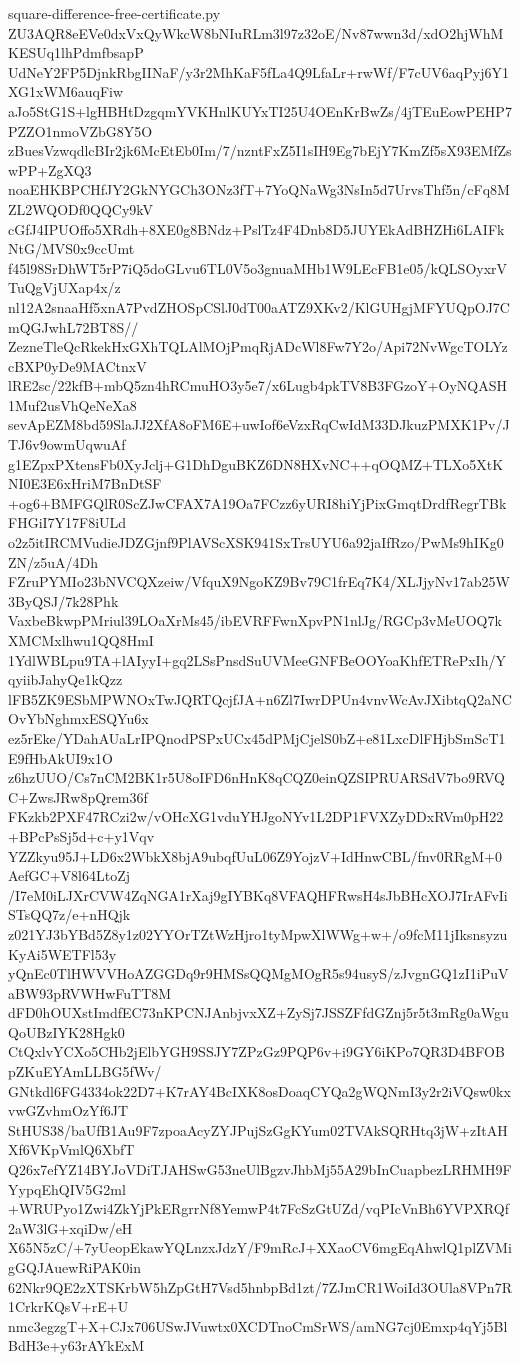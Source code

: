 \documentclass[11pt]{article}
\theoremstyle{definition}
\theoremstyle{remark}
\begin{document}
\begin{filecontents*}[overwrite]{square-difference-free-certificate.py}
ZU3AQR8eEVe0dxVxQyWkcW8bNIuRLm3l97z32oE/Nv87wwn3d/xdO2hjWhMKESUq1lhPdmfbsapP
UdNeY2FP5DjnkRbgIINaF/y3r2MhKaF5fLa4Q9LfaLr+rwWf/F7cUV6aqPyj6Y1XG1xWM6auqFiw
aJo5StG1S+lgHBHtDzgqmYVKHnlKUYxTI25U4OEnKrBwZs/4jTEuEowPEHP7PZZO1nmoVZbG8Y5O
zBuesVzwqdlcBIr2jk6McEtEb0Im/7/nzntFxZ5I1sIH9Eg7bEjY7KmZf5sX93EMfZswPP+ZgXQ3
noaEHKBPCHfJY2GkNYGCh3ONz3fT+7YoQNaWg3NsIn5d7UrvsThf5n/cFq8MZL2WQODf0QQCy9kV
cGfJ4IPUOffo5XRdh+8XE0g8BNdz+PslTz4F4Dnb8D5JUYEkAdBHZHi6LAIFkNtG/MVS0x9ccUmt
f45l98SrDhWT5rP7iQ5doGLvu6TL0V5o3gnuaMHb1W9LEcFB1e05/kQLSOyxrVTuQgVjUXap4x/z
nl12A2snaaHf5xnA7PvdZHOSpCSlJ0dT00aATZ9XKv2/KlGUHgjMFYUQpOJ7CmQGJwhL72BT8S//
ZezneTleQcRkekHxGXhTQLAlMOjPmqRjADcWl8Fw7Y2o/Api72NvWgcTOLYzcBXP0yDe9MACtnxV
lRE2sc/22kfB+mbQ5zn4hRCmuHO3y5e7/x6Lugb4pkTV8B3FGzoY+OyNQASH1Muf2usVhQeNeXa8
sevApEZM8bd59SlaJJ2XfA8oFM6E+uwIof6eVzxRqCwIdM33DJkuzPMXK1Pv/JTJ6v9owmUqwuAf
g1EZpxPXtensFb0XyJclj+G1DhDguBKZ6DN8HXvNC++qOQMZ+TLXo5XtKNI0E3E6xHriM7BnDtSF
+og6+BMFGQlR0ScZJwCFAX7A19Oa7FCzz6yURI8hiYjPixGmqtDrdfRegrTBkFHGiI7Y17F8iULd
o2z5itIRCMVudieJDZGjnf9PlAVScXSK941SxTrsUYU6a92jaIfRzo/PwMs9hIKg0ZN/z5uA/4Dh
FZruPYMIo23bNVCQXzeiw/VfquX9NgoKZ9Bv79C1frEq7K4/XLJjyNv17ab25W3ByQSJ/7k28Phk
VaxbeBkwpPMriul39LOaXrMs45/ibEVRFFwnXpvPN1nlJg/RGCp3vMeUOQ7kXMCMxlhwu1QQ8HmI
1YdlWBLpu9TA+lAIyyI+gq2LSsPnsdSuUVMeeGNFBeOOYoaKhfETRePxIh/YqyiibJahyQe1kQzz
lFB5ZK9ESbMPWNOxTwJQRTQcjfJA+n6Zl7IwrDPUn4vnvWcAvJXibtqQ2aNCOvYbNghmxESQYu6x
ez5rEke/YDahAUaLrIPQnodPSPxUCx45dPMjCjelS0bZ+e81LxcDlFHjbSmScT1E9fHbAkUI9x1O
z6hzUUO/Cs7nCM2BK1r5U8oIFD6nHnK8qCQZ0einQZSIPRUARSdV7bo9RVQC+ZwsJRw8pQrem36f
FKzkb2PXF47RCzi2w/vOHcXG1vduYHJgoNYv1L2DP1FVXZyDDxRVm0pH22+BPcPsSj5d+c+y1Vqv
YZZkyu95J+LD6x2WbkX8bjA9ubqfUuL06Z9YojzV+IdHnwCBL/fnv0RRgM+0AefGC+V8l64LtoZj
/I7eM0iLJXrCVW4ZqNGA1rXaj9gIYBKq8VFAQHFRwsH4sJbBHcXOJ7IrAFvIiSTsQQ7z/e+nHQjk
z021YJ3bYBd5Z8y1z02YYOrTZtWzHjro1tyMpwXlWWg+w+/o9fcM11jIksnsyzuKyAi5WETFl53y
yQnEc0TlHWVVHoAZGGDq9r9HMSsQQMgMOgR5s94usyS/zJvgnGQ1zI1iPuVaBW93pRVWHwFuTT8M
dFD0hOUXstImdfEC73nKPCNJAnbjvxXZ+ZySj7JSSZFfdGZnj5r5t3mRg0aWguQoUBzIYK28Hgk0
CtQxlvYCXo5CHb2jElbYGH9SSJY7ZPzGz9PQP6v+i9GY6iKPo7QR3D4BFOBpZKuEYAmLLBG5fWv/
GNtkdl6FG4334ok22D7+K7rAY4BcIXK8osDoaqCYQa2gWQNmI3y2r2iVQsw0kxvwGZvhmOzYf6JT
StHUS38/baUfB1Au9F7zpoaAcyZYJPujSzGgKYum02TVAkSQRHtq3jW+zItAHXf6VKpVmlQ6XbfT
Q26x7efYZ14BYJoVDiTJAHSwG53neUlBgzvJhbMj55A29bInCuapbezLRHMH9FYypqEhQIV5G2ml
+WRUPyo1Zwi4ZkYjPkERgrrNf8YemwP4t7FcSzGtUZd/vqPIcVnBh6YVPXRQf2aW3lG+xqiDw/eH
X65N5zC/+7yUeopEkawYQLnzxJdzY/F9mRcJ+XXaoCV6mgEqAhwlQ1plZVMigGQJAuewRiPAK0in
62Nkr9QE2zXTSKrbW5hZpGtH7Vsd5hnbpBd1zt/7ZJmCR1WoiId3OUla8VPn7R1CrkrKQsV+rE+U
nmc3egzgT+X+CJx706USwJVuwtx0XCDTnoCmSrWS/amNG7cj0Emxp4qYj5BlBdH3e+y63rAYkExM

\end{filecontents*}
\end{document}

